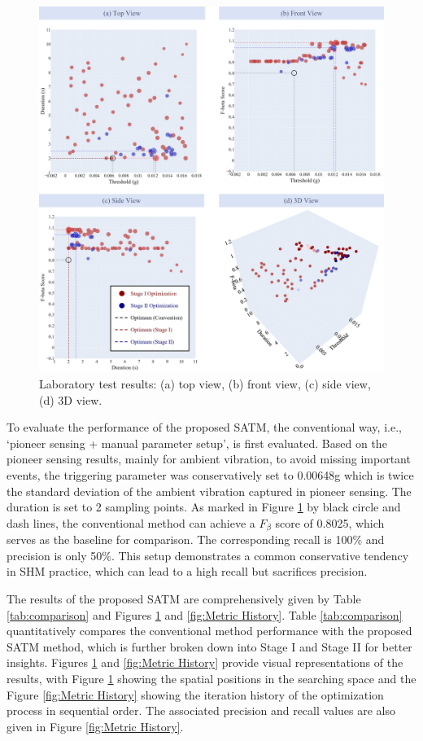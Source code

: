 \documentclass[a4paper,fleqn,numbers,sort&compress]{cas-sc}
\begin{document}
\begin{figure}[htbp]
    \centering
    \includegraphics[width=\linewidth]{Fig15.jpg}
    \caption{Laboratory test results: (a) top view, (b) front view, (c) side view, (d) 3D view.}
    \label{fig:Lab Test Results}
\end{figure}

To evaluate the performance of the proposed SATM, the conventional way, i.e., `pioneer sensing + manual parameter setup', is first evaluated. Based on the pioneer sensing results, mainly for ambient vibration, to avoid missing important events, the triggering parameter was conservatively set to 0.00648g which is twice the standard deviation of the ambient vibration captured in pioneer sensing. The duration is set to 2 sampling points. As marked in Figure \ref{fig:Lab Test Results} by black circle and dash lines, the conventional method can achieve a $F_{\beta}$ score of 0.8025, which serves as the baseline for comparison. The corresponding recall is 100\% and precision is only 50\%. This setup demonstrates a common conservative tendency in SHM practice, which can lead to a high recall but sacrifices precision.

The results of the proposed SATM are comprehensively given by Table \ref{tab:comparison} and Figures \ref{fig:Lab Test Results} and \ref{fig:Metric History}. Table \ref{tab:comparison} quantitatively compares the conventional method performance with the proposed SATM method, which is further broken down into Stage I and Stage II for better insights. Figures \ref{fig:Lab Test Results} and \ref{fig:Metric History} provide visual representations of the results, with Figure \ref{fig:Lab Test Results} showing the spatial positions in the searching space and the Figure \ref{fig:Metric History} showing the iteration history of the optimization process in sequential order. The associated precision and recall values are also given in Figure \ref{fig:Metric History}.
\end{document}
